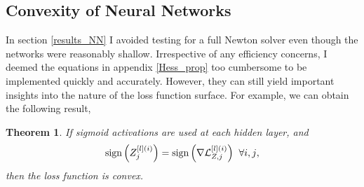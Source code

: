 \documentclass[nohyperref]{article}
\theoremstyle{plain}
\newtheorem{theorem}{Theorem}[section]
\theoremstyle{definition}
\theoremstyle{remark}
\DeclareMathOperator*{\sgn}{sign}
\begin{document}
\subsection{Convexity of Neural Networks}\label{app_convex}
In section \ref{results_NN} I avoided testing for a full Newton solver even though the networks were reasonably shallow. Irrespective of any efficiency concerns, I deemed the equations in appendix \ref{Hess_prop} too cumbersome to be implemented quickly and accurately. However, they can still yield important insights into the nature of the loss function surface. For example, we can obtain the following result,
\begin{theorem}
\label{thm:bigtheorem}
If sigmoid activations are used at each hidden layer, and
\begin{equation}
\sgn{\left(Z_j^{[l](i)}\right)}= \sgn{\left(\nabla \mathcal{L}^{[l](i)}_{Z,j} \right)} \hspace{0.2cm} \forall{i,j},\label{convex_condition}
\end{equation}
then the loss function is convex.
\end{theorem}
\end{document}
